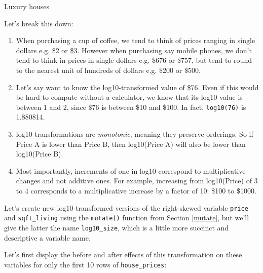\documentclass[12pt,]{krantz}
\makeatletter
\newenvironment{Shaded}{\begin{snugshade}}{\end{snugshade}}
\newcommand{\KeywordTok}[1]{\textcolor[rgb]{0.27,0.27,0.27}{\textbf{#1}}}
\newcommand{\DataTypeTok}[1]{\textcolor[rgb]{0.27,0.27,0.27}{#1}}
\newcommand{\StringTok}[1]{\textcolor[rgb]{0.5,0.5,0.5}{#1}}
\newcommand{\OperatorTok}[1]{\textcolor[rgb]{0.43,0.43,0.43}{\textbf{#1}}}
\newcommand{\NormalTok}[1]{#1}
\providecommand{\tightlist}{%
  \setlength{\itemsep}{0pt}\setlength{\parskip}{0pt}}
\newenvironment{kframe}{%
\medskip{}
\setlength{\fboxsep}{.8em}
 \def\at@end@of@kframe{}%
 \ifinner\ifhmode%
  \def\at@end@of@kframe{\end{minipage}}%
  \begin{minipage}{\columnwidth}%
 \fi\fi%
 \def\FrameCommand##1{\hskip\@totalleftmargin \hskip-\fboxsep
 \colorbox{shadecolor}{##1}\hskip-\fboxsep
     \hskip-\linewidth \hskip-\@totalleftmargin \hskip\columnwidth}%
 \MakeFramed {\advance\hsize-\width
   \@totalleftmargin\z@ \linewidth\hsize
   \@setminipage}}%
 {\par\unskip\endMakeFramed%
 \at@end@of@kframe}
\renewenvironment{Shaded}{\begin{kframe}}{\end{kframe}}
\makeatother
\begin{document}
Luxury houses

Let's break this down:

\begin{enumerate}
\def\labelenumi{\arabic{enumi}.}
\tightlist
\item
  When purchasing a cup of coffee, we tend to think of prices ranging in
  single dollars e.g. \$2 or \$3. However when purchasing say mobile
  phones, we don't tend to think in prices in single dollars e.g. \$676
  or \$757, but tend to round to the nearest unit of hundreds of dollars
  e.g. \$200 or \$500.
\item
  Let's say want to know the log10-transformed value of \$76. Even if
  this would be hard to compute without a calculator, we know that its
  log10 value is between 1 and 2, since \$76 is between \$10 and \$100.
  In fact, \texttt{log10(76)} is 1.880814.
\item
  log10-transformations are \emph{monotonic}, meaning they preserve
  orderings. So if Price A is lower than Price B, then log10(Price A)
  will also be lower than log10(Price B).
\item
  Most importantly, increments of one in log10 correspond to
  multiplicative changes and not additive ones. For example, increasing
  from log10(Price) of 3 to 4 corresponds to a multiplicative increase
  by a factor of 10: \$100 to \$1000.
\end{enumerate}

Let's create new log10-transformed versions of the right-skewed variable
\texttt{price} and \texttt{sqft\_living} using the \texttt{mutate()}
function from Section \ref{mutate}, but we'll give the latter the name
\texttt{log10\_size}, which is a little more succinct and descriptive a
variable name.

\begin{Shaded}
\end{Shaded}

Let's first display the before and after effects of this transformation
on these variables for only the first 10 rows of \texttt{house\_prices}:

\begin{Shaded}
\end{Shaded}
\end{document}
